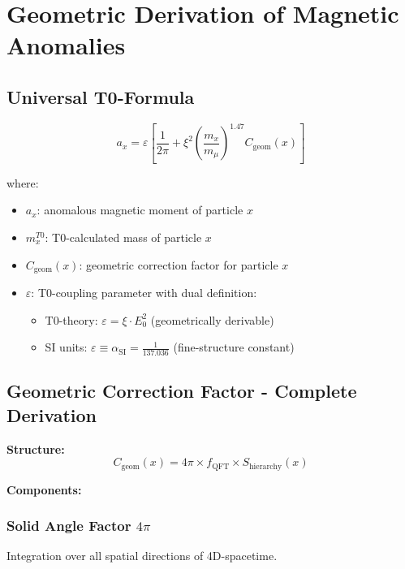 \documentclass[12pt,a4paper]{article}
\numberwithin{equation}{section}
\newcommand{\xipar}{\xi}
\newcommand{\epsilonT}{\varepsilon}
\newcommand{\alphaSI}{\alpha_{\text{SI}}}
\newcommand{\Cgeom}{C_{\text{geom}}}
\newcommand{\fQFT}{f_{\text{QFT}}}
\newcommand{\Eo}{E_0}
\begin{document}
	\section{Geometric Derivation of Magnetic Anomalies}
	
	\subsection{Universal T0-Formula}
	
	\begin{equation}
		a_x = \epsilonT \left[ \frac{1}{2\pi} + \xipar^2 \left(\frac{m_x}{m_\mu}\right)^{1.47} \Cgeom(x) \right]
		\label{eq:universal_formula}
	\end{equation}
	
	where:
	\begin{itemize}
		\item $a_x$: anomalous magnetic moment of particle $x$
		\item $m_x^{T0}$: T0-calculated mass of particle $x$
		\item $\Cgeom(x)$: geometric correction factor for particle $x$
		\item $\epsilonT$: T0-coupling parameter with dual definition:
		\begin{itemize}
			\item T0-theory: $\epsilonT = \xipar \cdot \Eo^2$ (geometrically derivable)
			\item SI units: $\epsilonT \equiv \alphaSI = \frac{1}{137.036}$ (fine-structure constant)
		\end{itemize}
	\end{itemize}
	
	\subsection{Geometric Correction Factor - Complete Derivation}
	
	\textbf{Structure:}
	\begin{equation}
		\Cgeom(x) = 4\pi \times \fQFT \times S_{\text{hierarchy}}(x)
		\label{eq:cgeom_structure}
	\end{equation}
	
	\textbf{Components:}
	
	\subsubsection{Solid Angle Factor $4\pi$}
	Integration over all spatial directions of 4D-spacetime.
	
\end{document}
